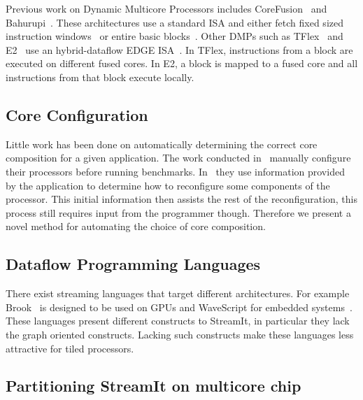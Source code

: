 Previous work on Dynamic Multicore Processors includes CoreFusion~\cite{ipek2007CoreFusion} and Bahurupi~\cite{pricopi2012bahurupi,pricopiSchedCoreComp2014}.
These architectures use a standard ISA and either fetch fixed sized instruction windows~\cite{ipek2007CoreFusion} or entire basic blocks~\cite{pricopi2012bahurupi}.
Other DMPs such as TFlex~\cite{kim2007tflex} and E2~\cite{e2} use an hybrid-dataflow EDGE ISA~\cite{burger04edge}. 
In TFlex, instructions from a block are executed on different fused cores.
In E2, a block is mapped to a fused core and all instructions from that block execute locally.

\subsection{Core Configuration}

Little work has been done on automatically determining the correct core composition for a given application.
The work conducted in~\cite{ipek2007CoreFusion,kim2007tflex} manually configure their processors before running benchmarks.
In~\cite{santos2013nocdmc} they use information provided by the application to determine how to reconfigure some components of the processor.
This initial information then assists the rest of the reconfiguration, this process still requires input from the programmer though.
Therefore we present a novel method for automating the choice of core composition.  

\subsection{Dataflow Programming Languages}

There exist streaming languages that target different architectures.
For example Brook~\cite{buck2004brook} is designed to be used on GPUs and WaveScript for embedded systems~\cite{newton2008wavescript}.
These languages present different constructs to StreamIt, in particular they lack the graph oriented constructs. 
Lacking such constructs make these languages less attractive for tiled processors.

\subsection{Partitioning StreamIt on multicore chip}

